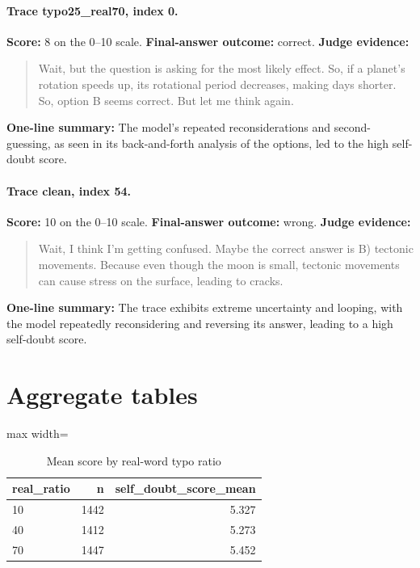 \documentclass[11pt]{article}
\begin{document}
\paragraph{Trace typo25\_real70, index 0.}
\textbf{Score:} 8 on the 0--10 scale. \textbf{Final-answer outcome:} correct.
\textbf{Judge evidence:} \begin{quote}Wait, but the question is asking for the most likely effect. So, if a planet's rotation speeds up, its rotational period decreases, making days shorter. So, option B seems correct. But let me think again.\end{quote}
\textbf{One-line summary:} The model's repeated reconsiderations and second-guessing, as seen in its back-and-forth analysis of the options, led to the high self-doubt score.\medskip
\paragraph{Trace clean, index 54.}
\textbf{Score:} 10 on the 0--10 scale. \textbf{Final-answer outcome:} wrong.
\textbf{Judge evidence:} \begin{quote}Wait, I think I'm getting confused. Maybe the correct answer is B) tectonic movements. Because even though the moon is small, tectonic movements can cause stress on the surface, leading to cracks.\end{quote}
\textbf{One-line summary:} The trace exhibits extreme uncertainty and looping, with the model repeatedly reconsidering and reversing its answer, leading to a high self-doubt score.\medskip

\section*{Aggregate tables}

\begin{table}[H]
\centering
\caption{Mean score by real-word typo ratio}
\small
\begin{adjustbox}{max width=\textwidth}
\begin{tabular}{lrr}
\toprule
\textbf{real\_ratio} & \textbf{n} & \textbf{self\_doubt\_score\_mean} \\
\midrule
10 & 1442 & 5.327 \\
40 & 1412 & 5.273 \\
70 & 1447 & 5.452 \\
\bottomrule
\end{tabular}
\end{adjustbox}
\end{table}
\end{document}
